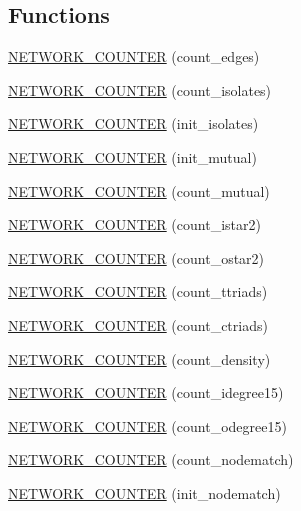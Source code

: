 \subsection*{Functions}
\begin{DoxyCompactItemize}
\item 
\hyperlink{namespacebarray_1_1counters_1_1network_a8f8a6f06ceb0b6e870190ab45efaf014}{N\+E\+T\+W\+O\+R\+K\+\_\+\+C\+O\+U\+N\+T\+ER} (count\+\_\+edges)
\item 
\hyperlink{namespacebarray_1_1counters_1_1network_a239d5967ab4a8d090012045be1581e8d}{N\+E\+T\+W\+O\+R\+K\+\_\+\+C\+O\+U\+N\+T\+ER} (count\+\_\+isolates)
\item 
\hyperlink{namespacebarray_1_1counters_1_1network_a303911261d3f9aaa51ddab7f75d1c7fe}{N\+E\+T\+W\+O\+R\+K\+\_\+\+C\+O\+U\+N\+T\+ER} (init\+\_\+isolates)
\item 
\hyperlink{namespacebarray_1_1counters_1_1network_a4d8732777e548032bcb6b03a8f3d11b7}{N\+E\+T\+W\+O\+R\+K\+\_\+\+C\+O\+U\+N\+T\+ER} (init\+\_\+mutual)
\item 
\hyperlink{namespacebarray_1_1counters_1_1network_a6afd423628b36b76688b471b938ad51a}{N\+E\+T\+W\+O\+R\+K\+\_\+\+C\+O\+U\+N\+T\+ER} (count\+\_\+mutual)
\item 
\hyperlink{namespacebarray_1_1counters_1_1network_a02eab165900463c072a98af012efbc36}{N\+E\+T\+W\+O\+R\+K\+\_\+\+C\+O\+U\+N\+T\+ER} (count\+\_\+istar2)
\item 
\hyperlink{namespacebarray_1_1counters_1_1network_afee74fea27df5aac6981aa5889038beb}{N\+E\+T\+W\+O\+R\+K\+\_\+\+C\+O\+U\+N\+T\+ER} (count\+\_\+ostar2)
\item 
\hyperlink{namespacebarray_1_1counters_1_1network_aa1a31f2fdb25a5f3b6cbbb65742c04b3}{N\+E\+T\+W\+O\+R\+K\+\_\+\+C\+O\+U\+N\+T\+ER} (count\+\_\+ttriads)
\item 
\hyperlink{namespacebarray_1_1counters_1_1network_aedd72fb0d87553ddd9d23f7526a467c0}{N\+E\+T\+W\+O\+R\+K\+\_\+\+C\+O\+U\+N\+T\+ER} (count\+\_\+ctriads)
\item 
\hyperlink{namespacebarray_1_1counters_1_1network_abd51acac1781efe14b50083b4e6c59f4}{N\+E\+T\+W\+O\+R\+K\+\_\+\+C\+O\+U\+N\+T\+ER} (count\+\_\+density)
\item 
\hyperlink{namespacebarray_1_1counters_1_1network_ade93cadce2c8d5d3817ec7f5492611d0}{N\+E\+T\+W\+O\+R\+K\+\_\+\+C\+O\+U\+N\+T\+ER} (count\+\_\+idegree15)
\item 
\hyperlink{namespacebarray_1_1counters_1_1network_ada4601a5a1eebb4c6bfe8957f9e7b895}{N\+E\+T\+W\+O\+R\+K\+\_\+\+C\+O\+U\+N\+T\+ER} (count\+\_\+odegree15)
\item 
\hyperlink{namespacebarray_1_1counters_1_1network_a51cd484962531aad1113291762f900f5}{N\+E\+T\+W\+O\+R\+K\+\_\+\+C\+O\+U\+N\+T\+ER} (count\+\_\+nodematch)
\item 
\hyperlink{namespacebarray_1_1counters_1_1network_a28a150bca0fde8a2bc7feb9544e5cd51}{N\+E\+T\+W\+O\+R\+K\+\_\+\+C\+O\+U\+N\+T\+ER} (init\+\_\+nodematch)
\end{DoxyCompactItemize}

